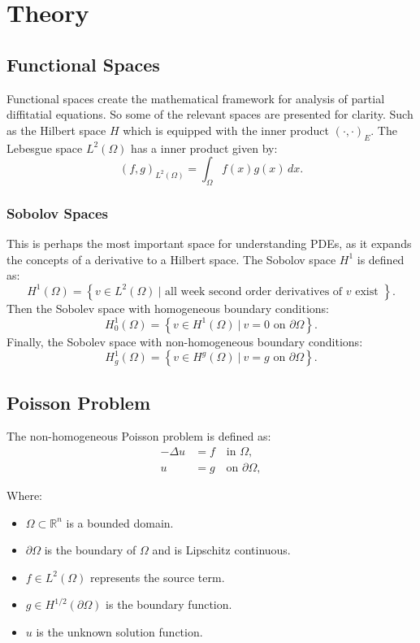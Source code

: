 \documentclass{report}
\begin{document}
\chapter{Theory}

\section{Functional Spaces}
Functional spaces create the mathematical framework for analysis of partial diffitatial equations. So some of the relevant spaces are presented for clarity. Such as the Hilbert space $H$ which is equipped with the inner product $(\cdot,\cdot)_E.$ The Lebesgue space $L^2(\Omega)$ has a inner product given by:
$$(f,g)_{L^2(\Omega)} = \int_{\Omega}f(x)g(x)\,dx.$$


\subsection{Sobolov Spaces}
This is perhaps the most important space for understanding PDEs, as it expands the concepts of a derivative to a Hilbert space. The Sobolov space $H^1$ is defined as:
$$ H^1(\Omega) = \left\{ v \in L^2(\Omega) \ \bigg| \text{ all week second order derivatives of $v$ exist }  \right\}. $$ \cite{brezis_functional_analysis}
Then the Sobolev space with homogeneous boundary conditions:
$$
H^1_0(\Omega) = \left\{ v \in H^1(\Omega) \ \bigg| \ v = 0 \text{ on } \partial\Omega \right\}.
$$
Finally, the Sobolev space with non-homogeneous boundary conditions:
$$
H^1_g(\Omega) = \left\{ v \in H^g(\Omega) \ \bigg| \ v = g \text{ on } \partial\Omega \right\}.
$$


\section{Poisson Problem}
The non-homogeneous Poisson problem is defined as:
\begin{align}
    -\Delta u &= f \quad \text{in } \Omega, \label{eq:poisson}\\
    u &= g \quad \text{on } \partial \Omega, \label{eq:dirichlet}
\end{align}

Where:
\begin{itemize}
    \item $\Omega \subset \mathbb{R}^n$ is a bounded domain.
    \item $\partial\Omega$ is the boundary of $\Omega$ and is Lipschitz continuous.
    \item $f \in L^2(\Omega)$ represents the source term.
    \item $g \in H^{1/2}(\partial\Omega)$ is the boundary function.
    \item $u$ is the unknown solution function.
\end{itemize}
\end{document}
